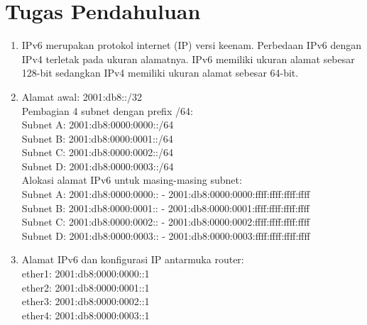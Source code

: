\section{Tugas Pendahuluan}
\begin{enumerate}
	\item IPv6 merupakan protokol internet (IP) versi keenam. Perbedaan IPv6 dengan IPv4 terletak pada ukuran alamatnya. IPv6 memiliki ukuran alamat sebesar 128-bit sedangkan IPv4 memiliki ukuran alamat sebesar 64-bit.
	
	\item Alamat awal: 2001:db8::/32\\
	Pembagian 4 subnet dengan prefix /64:\\
	Subnet A: 2001:db8:0000:0000::/64\\
	Subnet B: 2001:db8:0000:0001::/64\\
	Subnet C: 2001:db8:0000:0002::/64\\
	Subnet D: 2001:db8:0000:0003::/64\\
	Alokasi alamat IPv6 untuk masing-masing subnet:\\
	Subnet A: 2001:db8:0000:0000:: - 2001:db8:0000:0000:ffff:ffff:ffff:ffff\\
	Subnet B: 2001:db8:0000:0001:: - 2001:db8:0000:0001:ffff:ffff:ffff:ffff\\
	Subnet C: 2001:db8:0000:0002:: - 2001:db8:0000:0002:ffff:ffff:ffff:ffff\\
	Subnet D: 2001:db8:0000:0003:: - 2001:db8:0000:0003:ffff:ffff:ffff:ffff\\
	
	\item Alamat IPv6 dan konfigurasi IP antarmuka router:\\
	ether1: 2001:db8:0000:0000::1\\
	ether2: 2001:db8:0000:0001::1\\
	ether3: 2001:db8:0000:0002::1\\
	ether4: 2001:db8:0000:0003::1\\
	

\end{enumerate}
